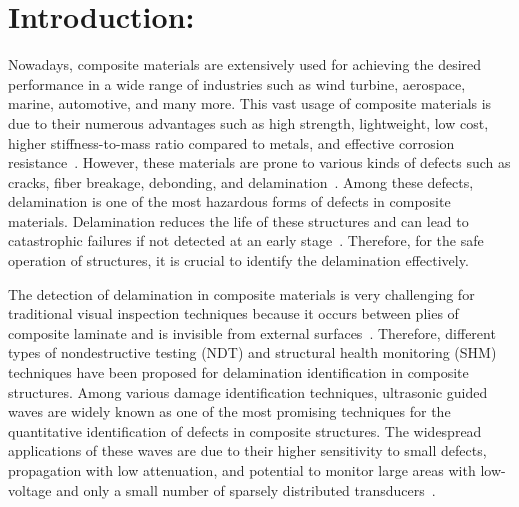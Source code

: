 \section{Introduction:}

Nowadays, composite materials are extensively used for achieving the desired performance in a wide range of industries such as wind turbine, aerospace, marine, automotive, and many more.
This vast usage of composite materials is due to their numerous advantages such as high strength, lightweight, low cost, higher stiffness-to-mass ratio compared to metals, and effective corrosion resistance~\cite{giurgiutiu2015structural, stoik2010nondestructive, poudel2015comparison}. %
However, these materials are prone to various kinds of defects such as cracks, fiber breakage, debonding, and delamination~\cite{poudel2015comparison, talreja2012damage}. %
Among these defects, delamination is one of the most hazardous forms of defects in composite materials. 
Delamination reduces the life of these structures and can lead to catastrophic failures if not detected at an early stage~\cite{talreja2012damage, wisnom2012role}.
Therefore, for the safe operation of structures, it is crucial to identify the delamination effectively.

The detection of delamination in composite materials is very challenging for traditional visual inspection techniques because it occurs between plies of composite laminate and is invisible from external surfaces~\cite{staszewski2009health, tuo2019damage}. 
Therefore, different types of nondestructive testing (NDT) and structural health monitoring (SHM) techniques have been proposed for delamination identification in composite structures.
Among various damage identification techniques, ultrasonic guided waves are widely known as one of the most promising techniques for the quantitative identification of defects in composite structures.
The widespread applications of these waves are due to their higher sensitivity 
to small defects, propagation with low attenuation, and potential to monitor 
large areas with low-voltage and only a small number of sparsely distributed 
transducers~\cite{Barthorpe2020, Ihn2008, Cantero-Chinchilla2020}. 

